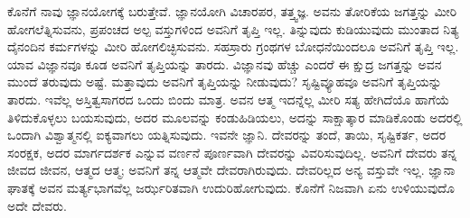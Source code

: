 ಕೊನೆಗೆ ನಾವು ಜ್ಞಾನಯೋಗಕ್ಕೆ ಬರುತ್ತೇವೆ. ಜ್ಞಾನಯೋಗಿ ವಿಚಾರಪರ, ತತ್ತ್ವಜ್ಞ. ಅವನು ತೋರಿಕೆಯ ಜಗತ್ತನ್ನು ಮೀರಿ ಹೋಗಲೆತ್ನಿಸುವನು, ಪ್ರಪಂಚದ ಅಲ್ಪ ವಸ್ತುಗಳಿಂದ ಅವನಿಗೆ ತೃಪ್ತಿ ಇಲ್ಲ. ತಿನ್ನುವುದು ಕುಡಿಯುವುದು ಮುಂತಾದ ನಿತ್ಯ ದೈನಂದಿನ ಕರ್ಮಗಳನ್ನು ಮೀರಿ ಹೋಗಲಿಚ್ಛಿಸುವನು. ಸಹಸ್ರಾರು ಗ್ರಂಥಗಳ ಬೋಧನೆಯಿಂದಲೂ ಅವನಿಗೆ ತೃಪ್ತಿ ಇಲ್ಲ. ಯಾವ ವಿಜ್ಞಾನವೂ ಕೂಡ ಅವನಿಗೆ ತೃಪ್ತಿಯನ್ನು ತಾರದು. ವಿಜ್ಞಾನವು ಹೆಚ್ಚು ಎಂದರೆ ಈ ಕ್ಷುದ್ರ ಜಗತ್ತನ್ನು ಅವನ ಮುಂದೆ ತರುವುದು ಅಷ್ಟೆ. ಮತ್ತಾವುದು ಅವನಿಗೆ ತೃಪ್ತಿಯನ್ನು ನೀಡುವುದು? ಸೃಷ್ಟಿವ್ಯೂಹವೂ ಅವನಿಗೆ ತೃಪ್ತಿಯನ್ನು ತಾರದು. ಇವೆಲ್ಲ ಅಸ್ತಿತ್ವಸಾಗರದ ಒಂದು ಬಿಂದು ಮಾತ್ರ. ಅವನ ಆತ್ಮ ಇದನ್ನೆಲ್ಲ ಮೀರಿ ಸತ್ಯ ಹೇಗಿದೆಯೊ ಹಾಗೆಯೆ ತಿಳಿದುಕೊಳ್ಳಲು ಬಯಸುವುದು, ಅದರ ಮೂಲವನ್ನು ಕಂಡುಹಿಡಿಯಲು, ಅದನ್ನು ಸಾಕ್ಷಾತ್ಕಾರ ಮಾಡಿಕೊಂಡು ಅದರಲ್ಲಿ ಒಂದಾಗಿ ವಿಶ್ವಾತ್ಮನಲ್ಲಿ ಐಕ್ಯವಾಗಲು ಯತ್ನಿಸುವುದು. ಇವನೇ ಜ್ಞಾನಿ. ದೇವರನ್ನು ತಂದೆ, ತಾಯಿ, ಸೃಷ್ಟಿಕರ್ತ, ಅದರ ಸಂರಕ್ಷಕ, ಅದರ ಮಾರ್ಗದರ್ಶಕ ಎನ್ನುವ ವರ್ಣನೆ ಪೂರ್ಣವಾಗಿ ದೇವರನ್ನು ವಿವರಿಸುವುದಿಲ್ಲ. ಅವನಿಗೆ ದೇವರು ತನ್ನ ಜೀವದ ಜೀವನ, ಆತ್ಮದ ಆತ್ಮ; ಅವನಿಗೆ ತನ್ನ ಆತ್ಮವೇ ದೇವರಾಗಿರುವುದು. ದೇವರಿಲ್ಲದ ಅನ್ಯ ವಸ್ತುವೇ ಇಲ್ಲ. ಜ್ಞಾನಾ ಘಾತಕ್ಕೆ ಅವನ ಮರ್ತ್ಯಭಾಗವೆಲ್ಲ ಜರ್ಝರಿತವಾಗಿ ಉದುರಿಹೋಗುವುದು. ಕೊನೆಗೆ ನಿಜವಾಗಿ ಏನು ಉಳಿಯುವುದೊ ಅದೇ ದೇವರು.

